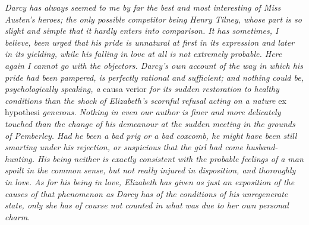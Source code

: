 \textit{Darcy has always seemed to me by far the best and most interesting of Miss Austen's heroes; the only possible competitor being Henry Tilney, whose part is so slight and simple that it hardly enters into comparison. It has sometimes, I believe, been urged that his pride is unnatural at first in its expression and later in its yielding, while his falling in love at all is not extremely probable. Here again I cannot go with the objectors. Darcy's own account of the way in which his pride had been pampered, is perfectly rational and sufficient; and nothing could be, psychologically speaking, a} causa verior \textit{for its sudden restoration to healthy conditions than the shock of Elizabeth's scornful refusal acting on a nature} ex hypothesi \textit{generous. Nothing in even our author is finer and more delicately touched than the change of his demeanour at the sudden meeting in the grounds of Pemberley. Had he been a bad prig or a bad coxcomb, he might have been still smarting under his rejection, or suspicious that the girl had come husband-hunting. His being neither is exactly consistent with the probable feelings of a man spoilt in the common sense, but not really injured in disposition, and thoroughly in love. As for his being in love, Elizabeth has given as just an exposition of the causes of that phenomenon as Darcy has of the conditions of his unregenerate state, only she has of course not counted in what was due to her own personal charm.}

